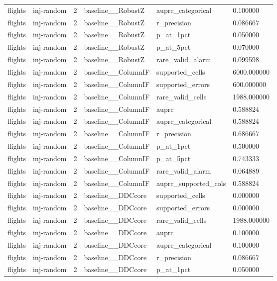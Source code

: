 \begin{tabular}{llllll}
flights & inj-random & 2 & baseline\_\_RobustZ & auprc\_categorical & 0.100000 \\
flights & inj-random & 2 & baseline\_\_RobustZ & r\_precision & 0.086667 \\
flights & inj-random & 2 & baseline\_\_RobustZ & p\_at\_1pct & 0.050000 \\
flights & inj-random & 2 & baseline\_\_RobustZ & p\_at\_5pct & 0.070000 \\
flights & inj-random & 2 & baseline\_\_RobustZ & rare\_valid\_alarm & 0.099598 \\
flights & inj-random & 2 & baseline\_\_ColumnIF & supported\_cells & 6000.000000 \\
flights & inj-random & 2 & baseline\_\_ColumnIF & supported\_errors & 600.000000 \\
flights & inj-random & 2 & baseline\_\_ColumnIF & rare\_valid\_cells & 1988.000000 \\
flights & inj-random & 2 & baseline\_\_ColumnIF & auprc & 0.588824 \\
flights & inj-random & 2 & baseline\_\_ColumnIF & auprc\_categorical & 0.588824 \\
flights & inj-random & 2 & baseline\_\_ColumnIF & r\_precision & 0.686667 \\
flights & inj-random & 2 & baseline\_\_ColumnIF & p\_at\_1pct & 0.500000 \\
flights & inj-random & 2 & baseline\_\_ColumnIF & p\_at\_5pct & 0.743333 \\
flights & inj-random & 2 & baseline\_\_ColumnIF & rare\_valid\_alarm & 0.064889 \\
flights & inj-random & 2 & baseline\_\_ColumnIF & auprc\_supported\_cols & 0.588824 \\
flights & inj-random & 2 & baseline\_\_DDCcore & supported\_cells & 0.000000 \\
flights & inj-random & 2 & baseline\_\_DDCcore & supported\_errors & 0.000000 \\
flights & inj-random & 2 & baseline\_\_DDCcore & rare\_valid\_cells & 1988.000000 \\
flights & inj-random & 2 & baseline\_\_DDCcore & auprc & 0.100000 \\
flights & inj-random & 2 & baseline\_\_DDCcore & auprc\_categorical & 0.100000 \\
flights & inj-random & 2 & baseline\_\_DDCcore & r\_precision & 0.086667 \\
flights & inj-random & 2 & baseline\_\_DDCcore & p\_at\_1pct & 0.050000 \\

\end{tabular}
